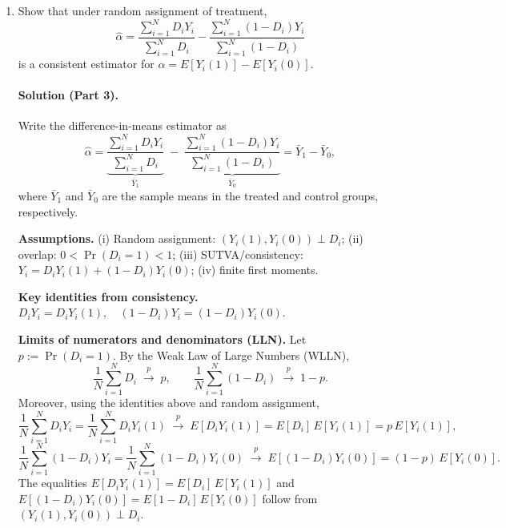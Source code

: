 \documentclass[12pt]{article}
\begin{document}
\begin{enumerate}[label=\arabic*.]
\medskip
\noindent\underline{Second identity: \(E[Y_i(1-D_i)] = E[Y_i(0)\mid D_i=0]\times \Pr(D_i=0)\).}
\[
\begin{aligned}
E[Y_i(1-D_i)]
&= E\!\big[\,E[Y_i(1-D_i) \mid D_i]\,\big] &&\text{(LIE)} \\
&= E\!\big[(1-D_i)\,E[Y_i \mid D_i]\big] &&\text{(pull out }1-D_i\text{)}\\
&= \Pr(D_i=0)\,E[Y_i \mid D_i=0] &&\text{(only the }D_i=0\text{ term survives)}\\
&= \Pr(D_i=0)\,E[Y_i(0) \mid D_i=0] &&\text{(consistency when }D_i=0\text{)}.
\end{aligned}
\]

\medskip
\noindent These equalities require only LIE and consistency/SUTVA; random assignment is
not needed for part (2).

  \item Show that under random assignment of treatment,
  \[
  \hat{\alpha} = 
  \frac{\sum_{i=1}^N D_i Y_i}{\sum_{i=1}^N D_i}
  - 
  \frac{\sum_{i=1}^N (1 - D_i) Y_i}{\sum_{i=1}^N (1 - D_i)}
  \]
  is a consistent estimator for $\alpha = E[Y_i(1)] - E[Y_i(0)]$.


  \paragraph{Solution (Part 3).}
    Write the difference-in-means estimator as
    \[
    \hat{\alpha}
    = \underbrace{\frac{\sum_{i=1}^N D_i Y_i}{\sum_{i=1}^N D_i}}_{\bar Y_1}
    \;-\;
    \underbrace{\frac{\sum_{i=1}^N (1-D_i) Y_i}{\sum_{i=1}^N (1-D_i)}}_{\bar Y_0}
    = \bar Y_1 - \bar Y_0 ,
    \]
    where $\bar Y_1$ and $\bar Y_0$ are the sample means in the treated and control
    groups, respectively.

    \textbf{Assumptions.} (i) Random assignment: $(Y_i(1),Y_i(0))\!\perp\! D_i$; (ii) overlap:
    $0<\Pr(D_i=1)<1$; (iii) SUTVA/consistency: $Y_i = D_iY_i(1) + (1-D_i)Y_i(0)$; (iv) finite first moments.

    \medskip
    \noindent\textbf{Key identities from consistency.}
    \(
    D_i Y_i = D_i Y_i(1), \quad (1-D_i)Y_i = (1-D_i)Y_i(0).
    \)

    \medskip
    \noindent\textbf{Limits of numerators and denominators (LLN).} Let $p:=\Pr(D_i=1)$.
    By the Weak Law of Large Numbers (WLLN),
    \[
    \frac{1}{N}\sum_{i=1}^N D_i \;\xrightarrow{p}\; p,
    \qquad
    \frac{1}{N}\sum_{i=1}^N (1-D_i) \;\xrightarrow{p}\; 1-p.
    \]
    Moreover, using the identities above and random assignment,
    \[
    \frac{1}{N}\sum_{i=1}^N D_i Y_i
    = \frac{1}{N}\sum_{i=1}^N D_i Y_i(1)
    \;\xrightarrow{p}\; E[D_i Y_i(1)]
    = E[D_i]\,E[Y_i(1)]
    = p\,E[Y_i(1)],
    \]
    \[
    \frac{1}{N}\sum_{i=1}^N (1-D_i) Y_i
    = \frac{1}{N}\sum_{i=1}^N (1-D_i) Y_i(0)
    \;\xrightarrow{p}\; E[(1-D_i) Y_i(0)]
    = (1-p)\,E[Y_i(0)].
    \]
    The equalities $E[D_i Y_i(1)] = E[D_i]\,E[Y_i(1)]$ and
    $E[(1-D_i)Y_i(0)] = E[1-D_i]\,E[Y_i(0)]$ follow from $(Y_i(1),Y_i(0))\!\perp\! D_i$.


\end{enumerate}
\end{document}
